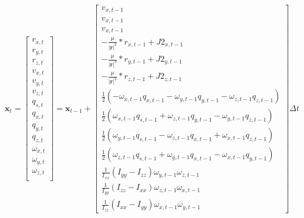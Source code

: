 \begin{equation}
    \mathbf{x}_t
    =
    \begin{bmatrix}
        r_{x,t} \\
        r_{y,t} \\
        r_{z,t} \\
        v_{x,t} \\
        v_{y,t} \\
        v_{z,t} \\
        q_{s,t} \\
        q_{x,t} \\
        q_{y,t} \\
        q_{z,t} \\
        \omega_{x,t} \\
        \omega_{y,t} \\
        \omega_{z,t} \\
    \end{bmatrix}
    = \mathbf{x}_{t-1} +
    \begin{bmatrix}
        v_{x,t-1} \\
        v_{x,t-1} \\
        v_{x,t-1} \\
        -\frac{\mu}{|\mathbf{r}|^3}*r_{x,t-1} + J2_{x,t-1} \\
        -\frac{\mu}{|\mathbf{r}|^3}*r_{y,t-1} + J2_{y,t-1} \\
        -\frac{\mu}{|\mathbf{r}|^3}*r_{z,t-1} + J2_{z,t-1} \\
        \frac{1}{2}(-\omega_{x,t-1}q_{x,t-1} - \omega_{y,t-1}q_{y,t-1} - \omega_{z,t-1}q_{z,t-1}) \\
        \frac{1}{2}( \omega_{x,t-1}q_{s,t-1} + \omega_{z,t-1}q_{y,t-1} - \omega_{y,t-1}q_{z,t-1}) \\
        \frac{1}{2}( \omega_{y,t-1}q_{s,t-1} - \omega_{z,t-1}q_{x,t-1} + \omega_{x,t-1}q_{z,t-1}) \\
        \frac{1}{2}( \omega_{z,t-1}q_{s,t-1} + \omega_{y,t-1}q_{x,t-1} - \omega_{x,t-1}q_{y,t-1}) \\
        \frac{1}{\mathit{I}_{xx}}(\mathit{I}_{yy}-\mathit{I}_{zz})\omega_{y,t-1}\omega_{z,t-1} \\
        \frac{1}{\mathit{I}_{yy}}(\mathit{I}_{zz}-\mathit{I}_{xx})\omega_{z,t-1}\omega_{x,t-1} \\
        \frac{1}{\mathit{I}_{zz}}(\mathit{I}_{xx}-\mathit{I}_{yy})\omega_{x,t-1}\omega_{y,t-1}
    \end{bmatrix}
    \Delta t
\end{equation}

